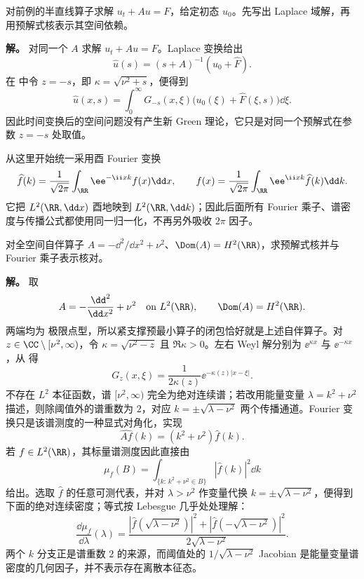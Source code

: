\begin{exbox}
\label{ex:math-sl-laplace-green-halfline}
对前例的半直线算子求解 $u_t+Au=F$，给定初态 $u_0$。先写出 Laplace 域解，再用预解式核表示其空间依赖。

\textbf{解。} 对同一个 $A$ 求解 $u_t+Au=F$。Laplace 变换给出
\[
 \widehat u(s)=(s+A)^{-1}(u_0+\widehat F).
\]
在 中令 $z=-s$，即 $\kappa=\sqrt{\nu^2+s}$，便得到
\[
 \widehat u(x,s)=\int_0^\infty G_{-s}(x,\xi)
 \bigl(u_0(\xi)+\widehat F(\xi,s)\bigr)\dd\xi.
\]
因此时间变换后的空间问题没有产生新 Green 理论，它只是对同一个预解式在参数 $z=-s$ 处取值。
\end{exbox}
从这里开始统一采用酉 Fourier 变换
\begin{equation}\label{eq:math-sl-unitary-fourier-convention}
 \widehat f(k)=\frac{1}{\sqrt{2\pi}}
 \int_{\RR}\ee^{-\ii xk}f(x)\dd x,
 \qquad
 f(x)=\frac{1}{\sqrt{2\pi}}
 \int_{\RR}\ee^{\ii xk}\widehat f(k)\dd k.
\end{equation}
它把 $L^2(\RR,\dd x)$ 酉地映到 $L^2(\RR,\dd k)$；因此后面所有 Fourier 乘子、谱密度与传播公式都使用同一归一化，不再另外吸收 $2\pi$ 因子。

\begin{exbox}
\label{ex:math-sl-line-free-green}
对全空间自伴算子 $A=-\dd^2/\dd x^2+\nu^2$、$\Dom(A)=H^2(\RR)$，求预解式核并与 Fourier 乘子表示核对。

\textbf{解。} 取
\[
 A=-\frac{\dd^2}{\dd x^2}+\nu^2
 \quad\text{on }L^2(\RR),
 \qquad
 \Dom(A)=H^2(\RR).
\]
两端均为 极限点型，所以紧支撑预最小算子的闭包恰好就是上述自伴算子。对 $z\in\CC\setminus[\nu^2,\infty)$，令 $\kappa=\sqrt{\nu^2-z}$ 且 $\Re\kappa>0$。左右 Weyl 解分别为 $\ee^{\kappa x}$ 与 $\ee^{-\kappa x}$，从 得
\begin{equation*}G_z(x,\xi)=\frac{1}{2\kappa(z)}\ee^{-\kappa(z)|x-\xi|}.
\end{equation*}
不存在 $L^2$ 本征函数，谱 $[\nu^2,\infty)$ 完全为绝对连续谱；若改用能量变量 $\lambda=k^2+\nu^2$ 描述，则除阈值外的谱重数为 $2$，对应 $k=\pm\sqrt{\lambda-\nu^2}$ 两个传播通道。Fourier 变换只是该谱测度的一种显式对角化，实现
\[
 \widehat{Af}(k)=(k^2+\nu^2)\widehat f(k).
\]
若 $f\in L^2(\RR)$，其标量谱测度因此直接由
\[
 \mu_f(B)=\int_{\{k:\,k^2+\nu^2\in B\}}|\widehat f(k)|^2\dd k
\]
给出。选取 $\widehat f$ 的任意可测代表，并对 $\lambda>\nu^2$ 作变量代换 $k=\pm\sqrt{\lambda-\nu^2}$，便得到下面的绝对连续密度；等式按 Lebesgue 几乎处处理解：
\begin{equation*}\frac{\dd\mu_f}{\dd\lambda}(\lambda)
 =\frac{
 |\widehat f(\sqrt{\lambda-\nu^2})|^2+
 |\widehat f(-\sqrt{\lambda-\nu^2})|^2}
 {2\sqrt{\lambda-\nu^2}}.
\end{equation*}
两个 $k$ 分支正是谱重数 $2$ 的来源，而阈值处的 $1/\sqrt{\lambda-\nu^2}$ Jacobian 是能量变量谱密度的几何因子，并不表示存在离散本征态。
\end{exbox}

